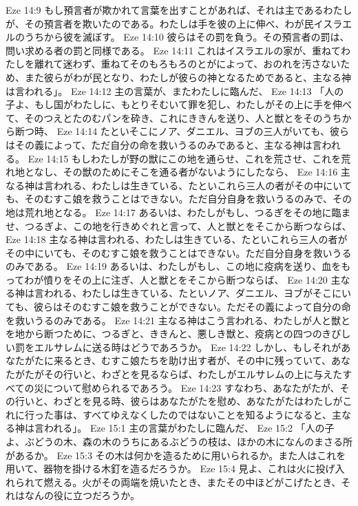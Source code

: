 Eze 14:9  もし預言者が欺かれて言葉を出すことがあれば、それは主であるわたしが、その預言者を欺いたのである。わたしは手を彼の上に伸べ、わが民イスラエルのうちから彼を滅ぼす。
Eze 14:10  彼らはその罰を負う。その預言者の罰は、問い求める者の罰と同様である。
Eze 14:11  これはイスラエルの家が、重ねてわたしを離れて迷わず、重ねてそのもろもろのとがによって、おのれを汚さないため、また彼らがわが民となり、わたしが彼らの神となるためであると、主なる神は言われる」。
Eze 14:12  主の言葉が、またわたしに臨んだ、
Eze 14:13  「人の子よ、もし国がわたしに、もとりそむいて罪を犯し、わたしがその上に手を伸べて、そのつえとたのむパンを砕き、これにききんを送り、人と獣とをそのうちから断つ時、
Eze 14:14  たといそこにノア、ダニエル、ヨブの三人がいても、彼らはその義によって、ただ自分の命を救いうるのみであると、主なる神は言われる。
Eze 14:15  もしわたしが野の獣にこの地を通らせ、これを荒させ、これを荒れ地となし、その獣のためにそこを通る者がないようにしたなら、
Eze 14:16  主なる神は言われる、わたしは生きている、たといこれら三人の者がその中にいても、そのむすこ娘を救うことはできない。ただ自分自身を救いうるのみで、その地は荒れ地となる。
Eze 14:17  あるいは、わたしがもし、つるぎをその地に臨ませ、つるぎよ、この地を行きめぐれと言って、人と獣とをそこから断つならば、
Eze 14:18  主なる神は言われる、わたしは生きている、たといこれら三人の者がその中にいても、そのむすこ娘を救うことはできない。ただ自分自身を救いうるのみである。
Eze 14:19  あるいは、わたしがもし、この地に疫病を送り、血をもってわが憤りをその上に注ぎ、人と獣とをそこから断つならば、
Eze 14:20  主なる神は言われる、わたしは生きている、たといノア、ダニエル、ヨブがそこにいても、彼らはそのむすこ娘を救うことができない。ただその義によって自分の命を救いうるのみである。
Eze 14:21  主なる神はこう言われる、わたしが人と獣とを地から断つために、つるぎと、ききんと、悪しき獣と、疫病との四つのきびしい罰をエルサレムに送る時はどうであろうか。
Eze 14:22  しかし、もしそれがあなたがたに来るとき、むすこ娘たちを助け出す者が、その中に残っていて、あなたがたがその行いと、わざとを見るならば、わたしがエルサレムの上に与えたすべての災について慰められるであろう。
Eze 14:23  すなわち、あなたがたが、その行いと、わざとを見る時、彼らはあなたがたを慰め、あなたがたはわたしがこれに行った事は、すべてゆえなくしたのではないことを知るようになると、主なる神は言われる」。
Eze 15:1  主の言葉がわたしに臨んだ、
Eze 15:2  「人の子よ、ぶどうの木、森の木のうちにあるぶどうの枝は、ほかの木になんのまさる所があるか。
Eze 15:3  その木は何かを造るために用いられるか。また人はこれを用いて、器物を掛ける木釘を造るだろうか。
Eze 15:4  見よ、これは火に投げ入れられて燃える。火がその両端を焼いたとき、またその中ほどがこげたとき、それはなんの役に立つだろうか。
